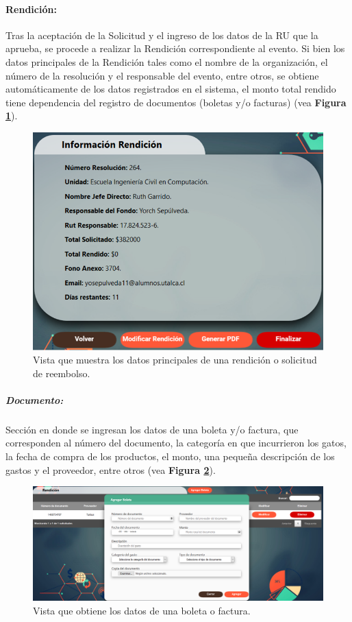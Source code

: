 \paragraph{Rendición: } Tras la aceptación de la Solicitud y el ingreso de los datos de la RU que la aprueba, se procede a realizar la Rendición correspondiente al evento. Si bien los datos principales de la Rendición tales como el nombre de la organización, el número de la resolución y el responsable del evento, entre otros, se obtiene automáticamente de los datos registrados en el sistema, el monto total rendido tiene dependencia del registro de documentos (boletas y/o facturas) (vea \textbf{Figura \ref{fig: Rendicion}}).

\begin{figure}[h]
    \centering
    \includegraphics[width= \textwidth]{Imagenes/Rendicion.png}
    \caption{\label{fig: Rendicion}Vista que muestra los datos principales de una rendición o solicitud de reembolso.}
\end{figure}


    \subparagraph{\emph{Documento: }} Sección en donde se ingresan los datos de una boleta y/o factura, que corresponden al número del documento, la categoría en que incurrieron los gatos, la fecha de compra de los productos, el monto, una pequeña descripción de los gastos y el proveedor, entre otros (vea \textbf{Figura \ref{fig: AgregarBoletas}}).

    \begin{figure}[h]
        \centering
        \includegraphics[width= \textwidth]{Imagenes/AgregarBoletas.PNG}
        \caption{\label{fig: AgregarBoletas}Vista que obtiene los datos de una boleta o factura.}
    \end{figure}




